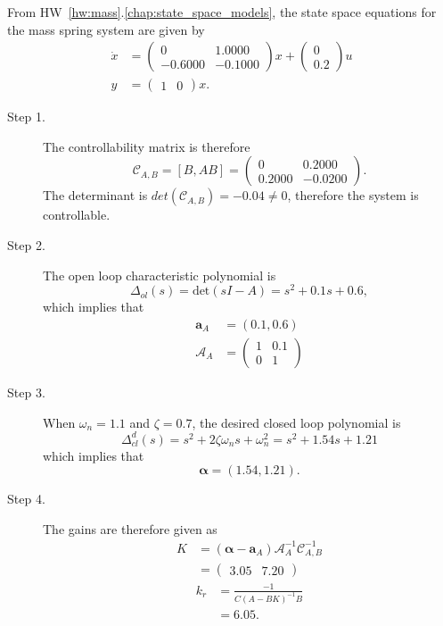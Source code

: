

From HW~\ref{hw:mass}.\ref{chap:state_space_models}, the state space equations for the mass spring system are given by
\begin{align*}
\dot{x} &= \begin{pmatrix} 
         0  &  1.0000 \\
   -0.6000  & -0.1000 \end{pmatrix}x + \begin{pmatrix} 0 \\ 0.2 \end{pmatrix} u \\
y &= \begin{pmatrix}1 & 0 \end{pmatrix}x.
\end{align*}
\begin{description}
\item[Step 1.] 
The controllability matrix is therefore
\[
\mathcal{C}_{A,B} = [B, AB] = \begin{pmatrix}           
	0  &  0.2000 \\
    0.2000 &  -0.0200 \end{pmatrix}.
\]
The determinant is $det(\mathcal{C}_{A,B})=-0.04\neq 0$, therefore the system is controllable.  
\item[Step 2.] The open loop characteristic polynomial is
\[
\Delta_{ol}(s)=\text{det}(sI-A) = s^2 +0.1 s + 0.6,
\]
which implies that
\begin{align*}
\mathbf{a}_A &= (0.1, 0.6) \\
\mathcal{A}_A &= \begin{pmatrix} 
1 & 0.1 \\ 0 & 1
\end{pmatrix}
\end{align*}

\item[Step 3.] When $\omega_n=1.1$ and $\zeta=0.7$, the desired closed loop polynomial is
\[
\Delta_{cl}^d(s) = s^2+2\zeta\omega_n s + \omega_n^2=s^2+1.54s+1.21       
\]
which implies that
\[
\boldsymbol{\alpha} = (1.54,    1.21).
\]

\item[Step 4.]
The gains are therefore given as
\begin{align*}
K &= (\boldsymbol{\alpha}-\mathbf{a}_A)\mathcal{A}_A^{-1}\mathcal{C}_{A,B}^{-1} \\
  &= \begin{pmatrix} 3.05 &   7.20 \end{pmatrix}
\end{align*}
\begin{align*}
k_r &= \frac{-1}{C(A-BK)^{-1}B} \\
    &= 6.05.
\end{align*}
\end{description}

